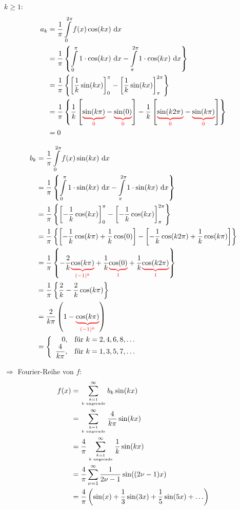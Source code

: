 $k\ge1$:
\begin{align*}
a_k&=\dfrac{1}{\pi}\int\limits_{0}^{2\pi}f(x)\cos(kx)\intd{x}\\
&=\dfrac{1}{\pi}\left\{\int\limits_{0}^{\pi}1\cdot\cos(kx)\intd{x}-\int\limits_{\pi}^{2\pi}1\cdot\cos(kx)\intd{x}\right\}\\
&=\dfrac{1}{\pi}\left\{\left[\frac{1}{k}\sin(kx)\right]_{0}^{\pi}-\left[\frac{1}{k}\sin(kx)\right]_{\pi}^{2\pi}\right\}\\
&=\dfrac{1}{\pi}\left\{\frac{1}{k}\left[\redunderbrace{\sin(k\pi)}{0}-\redunderbrace{\sin(0)}{0}\right]-\frac{1}{k}\left[\redunderbrace{\sin(k2\pi)}{0}-\redunderbrace{\sin(k\pi)}{0}\right]\right\}\\
&=0
\end{align*}

\begin{align*}
b_k&=\dfrac{1}{\pi}\int\limits_{0}^{2\pi}f(x)\sin(kx)\intd{x}\\
&=\dfrac{1}{\pi}\left\{\int\limits_{0}^{\pi}1\cdot\sin(kx)\intd{x}-\int\limits_{\pi}^{2\pi}1\cdot\sin(kx)\intd{x}\right\}\\
&=\dfrac{1}{\pi}\left\{\left[-\frac{1}{k}\cos(kx)\right]_{0}^{\pi}-\left[-\frac{1}{k}\cos(kx)\right]_{\pi}^{2\pi}\right\}\\
&=\dfrac{1}{\pi}\left\{\left[-\frac{1}{k}\cos(k\pi)+\frac{1}{k}\cos(0)\right]-\left[-\frac{1}{k}\cos(k2\pi)+\frac{1}{k}\cos(k\pi)\right]\right\}\\
&=\dfrac{1}{\pi}\left\{-\frac{2}{k}\redunderbrace{\cos(k\pi)}{(-1)^k}+\frac{1}{k}\redunderbrace{\cos(0)}{1}+\frac{1}{k}\redunderbrace{\cos(k2\pi)}{1}\right\}\\
&=\dfrac{1}{\pi}\left\{\frac{2}{k}-\frac{2}{k}\cos(k\pi)\right\}\\
&=\dfrac{2}{k\pi}\left(1-\redunderbrace{\cos(k\pi)}{(-1)^k}\right)\\
&=\left\{\begin{array}{rl}
0,&\text{für }k=2,4,6,8,\ldots\\
\dfrac{4}{k\pi},&\text{für }k=1,3,5,7,\ldots
\end{array}\right.
\end{align*}

$\Rightarrow$ Fourier-Reihe von $f$:
\begin{align*}
f(x)&=\sum\limits_{k=1\atop k\text{ ungerade}}^{\infty}b_k\sin(kx)\\
&=\sum\limits_{k=1\atop k\text{ ungerade}}^{\infty}\dfrac{4}{k\pi}\sin(kx)\\
&=\dfrac{4}{\pi}\sum\limits_{k=1\atop k\text{ ungerade}}^{\infty}\dfrac{1}{k}\sin(kx)\\
&=\dfrac{4}{\pi}\sum\limits_{\nu=1}^{\infty}\dfrac{1}{2\nu-1}\sin((2\nu-1)x)\\
&=\dfrac{4}{\pi}\left(\sin(x)+\dfrac{1}{3}\sin(3x)+\dfrac{1}{5}\sin(5x)+\ldots\right)
\end{align*}

